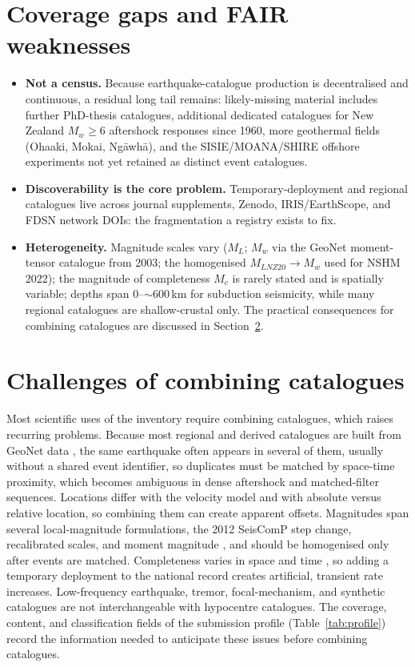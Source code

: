 \documentclass[10pt,a4paper]{article}
\begin{document}
\section{Coverage gaps and FAIR weaknesses}\label{sec:gaps}
\begin{itemize}[leftmargin=1.4em,itemsep=3pt]
\item \textbf{Not a census.} Because earthquake-catalogue production is decentralised and continuous, a residual long tail remains: likely-missing material includes further PhD-thesis catalogues, additional dedicated catalogues for New Zealand $M_w\!\geq\!6$ aftershock responses since 1960, more geothermal fields (Ohaaki, Mokai, Ng\=awh\=a), and the SISIE/MOANA/SHIRE offshore experiments not yet retained as distinct event catalogues.
\item \textbf{Discoverability is the core problem.} Temporary-deployment and regional catalogues live across journal supplements, Zenodo, IRIS/EarthScope, and FDSN network DOIs: the fragmentation a registry exists to fix.
\item \textbf{Heterogeneity.} Magnitude scales vary ($M_L$; $M_w$ via the GeoNet moment-tensor catalogue from 2003; the homogenised $M_{LNZ20}\!\rightarrow\!M_w$ used for NSHM 2022); the magnitude of completeness $M_c$ is rarely stated and is spatially variable; depths span 0--$\sim$600\,km for subduction seismicity, while many regional catalogues are shallow-crustal only. The practical consequences for combining catalogues are discussed in Section~\ref{sec:merging}.
\end{itemize}
\section{Challenges of combining catalogues}\label{sec:merging}
Most scientific uses of the inventory require combining catalogues, which raises recurring problems. Because most regional and derived catalogues are built from GeoNet data \cite{EberhartPhillips2022,IllsleyKemp2025,Williams2026}, the same earthquake often appears in several of them, usually without a shared event identifier, so duplicates must be matched by space-time proximity, which becomes ambiguous in dense aftershock and matched-filter sequences. Locations differ with the velocity model \cite{EberhartPhillips2022a} and with absolute versus relative location, so combining them can create apparent offsets. Magnitudes span several local-magnitude formulations, the 2012 SeisComP step change, recalibrated scales, and moment magnitude \cite{Ristau2009,Christophersen2024}, and should be homogenised only after events are matched. Completeness varies in space and time \cite{Woessner2005}, so adding a temporary deployment to the national record creates artificial, transient rate increases. Low-frequency earthquake, tremor, focal-mechanism, and synthetic catalogues are not interchangeable with hypocentre catalogues. The coverage, content, and classification fields of the submission profile (Table~\ref{tab:profile}) record the information needed to anticipate these issues before combining catalogues.
\end{document}
